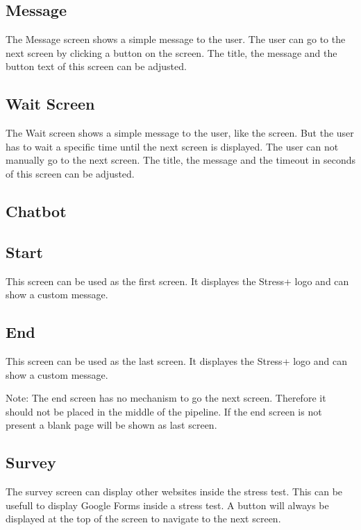 \subsection{Message}
\label{sec:screens-message}
The Message screen shows a simple message to the user.
The user can go to the next screen by clicking a button on the screen.
The title, the message and the button text of this screen can be adjusted.

\subsection{Wait Screen}
\label{sec:screens-wait-screen}

The Wait screen shows a simple message to the user, like the  screen.
But the user has to wait a specific time until the next screen is displayed.
The user can not manually go to the next screen.
The title, the message and the timeout in seconds of this screen can be adjusted.

\subsection{Chatbot}
\label{sec:screens-chatbot}

\subsection{Start}
\label{sec:screens-start}

This screen can be used as the first screen.
It displayes the Stress+ logo and can show a custom message.

\subsection{End}
\label{sec:screens-end}

This screen can be used as the last screen.
It displayes the Stress+ logo and can show a custom message.

Note: The end screen has no mechanism to go the next screen. Therefore it should not be placed in the middle of the pipeline.
If the end screen is not present a blank page will be shown as last screen.

\subsection{Survey}
\label{sec:screens-survey}

The survey screen can display other websites inside the stress test. 
This can be usefull to display Google Forms inside a stress test.
A button will always be displayed at the top of the screen to navigate to the next screen.
